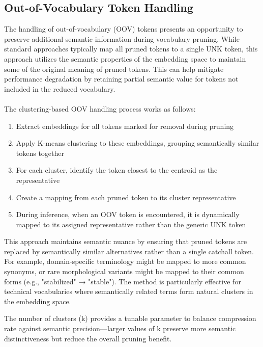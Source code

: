 \documentclass[twocolumn]{article}
\begin{document}
\subsection{Out-of-Vocabulary Token Handling}
The handling of out-of-vocabulary (OOV) tokens presents an opportunity to preserve additional semantic information during vocabulary pruning. While standard approaches typically map all pruned tokens to a single UNK token, this approach utilizes the semantic properties of the embedding space to maintain some of the original meaning of pruned tokens. This can help mitigate performance degradation by retaining partial semantic value for tokens not included in the reduced vocabulary.
\\ \\
The clustering-based OOV handling process works as follows:
\begin{enumerate}
    \item Extract embeddings for all tokens marked for removal during pruning
    \item Apply K-means clustering to these embeddings, grouping semantically similar tokens together
    \item For each cluster, identify the token closest to the centroid as the representative
    \item Create a mapping from each pruned token to its cluster representative
    \item During inference, when an OOV token is encountered, it is dynamically mapped to its assigned representative rather than the generic UNK token
\end{enumerate}
This approach maintains semantic nuance by ensuring that pruned tokens are replaced by semantically similar alternatives rather than a single catchall token. For example, domain-specific terminology might be mapped to more common synonyms, or rare morphological variants might be mapped to their common forms (e.g., "stabilized" → "stable"). The method is particularly effective for technical vocabularies where semantically related terms form natural clusters in the embedding space.

The number of clusters (k) provides a tunable parameter to balance compression rate against semantic precision—larger values of k preserve more semantic distinctiveness but reduce the overall pruning benefit. 
\end{document}
